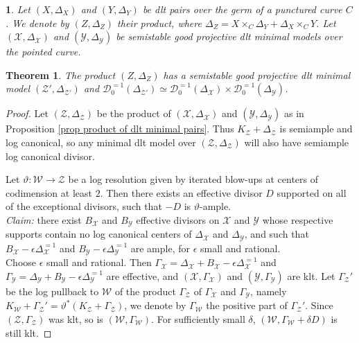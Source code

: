 \documentclass{amsart}%
\numberwithin{equation}{subsection}
\theoremstyle{plain2}
\newtheorem{theorem}[equation]{Theorem}
\theoremstyle{definition2}
\theoremstyle{stepstyle}
\theoremstyle{point}
\theoremstyle{subpoint}
\newtheorem{subpoint}[equation]{}%
\newcommand{\spa}[1]{\begin{subpoint}#1\end{subpoint}}           %
\newcommand{\D}{{\mathcal D}}
\newcommand{\cX}{\ensuremath{\mathscr{X}}}
\newcommand{\cY}{\ensuremath{\mathscr{Y}}}
\newcommand{\cZ}{\ensuremath{\mathscr{Z}}}
\newcommand{\cW}{\ensuremath{\mathscr{W}}}
\renewcommand{\cY}{\ensuremath{\mathscr{Y}}}
\begin{document}
\spa{Let $(X,\Delta_X)$ and $(Y,\Delta_Y)$ be dlt pairs over the germ of a punctured curve $C$. We denote by $(Z,\Delta_Z)$ their product, where $\Delta_Z = X \times_C \Delta_Y + \Delta_X \times_C Y$. Let $(\cX,\Delta_{\cX})$ and $(\cY,\Delta_{\cY})$ be semistable good projective dlt minimal models over the pointed curve. }

\begin{theorem}\label{thm product of dual complex of good min dlt models} The product $(Z, \Delta_Z)$ has a semistable good projective dlt minimal model $(\cZ', \Delta_{\cZ'})$ and $\D^{=1}_0(\Delta_{\cZ'}) \simeq \D^{=1}_0(\Delta_\cX) \times \D^{=1}_0(\Delta_\cY)$.
\end{theorem}
\begin{proof}
Let $(\cZ,\Delta_{\cZ})$ be the product of $(\cX,\Delta_{\cX})$ and $(\cY,\Delta_{\cY})$ as in Proposition \ref{prop product of dlt minimal pairs}. Thus $K_{\cZ}+\Delta_{\cZ}$ is semiample and log canonical, so any minimal dlt model over $(\cZ, \Delta_{\cZ})$ will also have semiample log canonical divisor.

Let $\vartheta: \cW \rightarrow \cZ$ be a log resolution given by iterated blow-ups at centers of codimension at least $2$. Then there exists an effective divisor $D$ supported on all of the exceptional divisors, such that $-D$ is $\vartheta$-ample.
\\

\emph{Claim:} there exist $B_\cX$ and $B_\cY$ effective divisors on $\cX$ and $\cY$ whose respective supports contain no log canonical centers of $\Delta_{\cX}$ and $\Delta_{\cY}$, and such that $B_\cX - \epsilon \Delta_{\cX}^{=1}$ and $B_\cY - \epsilon \Delta_{\cY}^{=1}$ are ample, for $\epsilon$ small and rational.
\\

Choose $\epsilon$ small and rational. Then $\Gamma_\cX=\Delta_\cX +B_\cX -\epsilon \Delta_{\cX}^{=1}$ and $\Gamma_\cY=\Delta_\cY +B_\cY -\epsilon \Delta_{\cY}^{=1}$ are effective, and $(\cX,\Gamma_\cX)$ and $(\cY,\Gamma_\cY)$ are klt. Let $\Gamma_{\cZ}'$ be the log pullback to $\cW$ of the product $\Gamma_\cZ$ of $\Gamma_\cX$ and $\Gamma_\cY$, namely $K_\cW + \Gamma_{\cZ}' = \vartheta^*(K_\cZ + \Gamma_{\cZ})$, we denote by $\Gamma_\cW$ the positive part of $\Gamma_{\cZ}'$. Since $(\cZ,\Gamma_\cZ)$ was klt, so is $(\cW,\Gamma_\cW)$. For sufficiently small $\delta$, $(\cW, \Gamma_\cW+\delta D)$ is still klt.


\end{proof}
\end{document}
